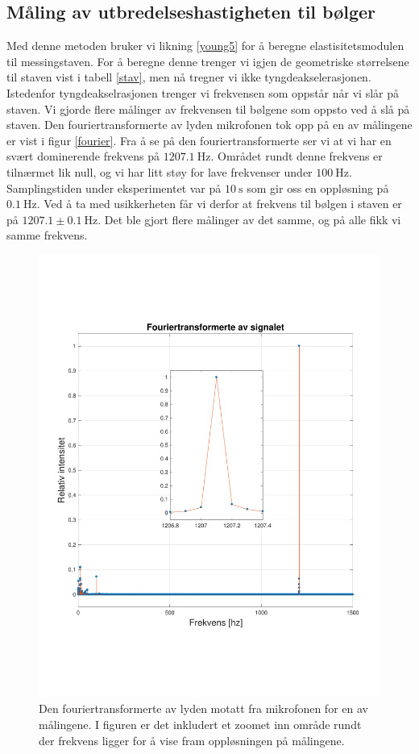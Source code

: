 \documentclass[%
 reprint,
 amsmath,amssymb,
 aps,
]{revtex4-1}
\begin{document}
\subsection{Måling av utbredelseshastigheten til bølger}
Med denne metoden bruker vi likning \eqref{young5} for å beregne elastisitetsmodulen til messingstaven. For å beregne denne trenger vi igjen de geometriske størrelsene til staven vist i tabell \vref{stav}, men nå tregner vi ikke tyngdeakselerasjonen. Istedenfor tyngdeakselrasjonen trenger vi frekvensen som oppstår når vi slår på staven.
Vi gjorde flere målinger av frekvensen til bølgene som oppsto ved å slå på staven. Den fouriertransformerte av lyden mikrofonen tok opp på en av målingene er vist i figur \vref{fourier}. Fra å se på den fouriertransformerte ser vi at vi har en svært dominerende frekvens på $\SI{1207.1}{\hertz}$. Området rundt denne frekvens er tilnærmet lik null, og vi har litt støy for lave frekvenser under $\SI{100}{\hertz}$. Samplingstiden under eksperimentet var på $\SI{10}{\second}$ som gir oss en oppløsning på $\SI{0.1}{\hertz}$. Ved å ta med usikkerheten får vi derfor at frekvens til bølgen i staven er på $1207.1\pm\SI{0.1}{\hertz}$. Det ble gjort flere målinger av det samme, og på alle fikk vi samme frekvens.
\begin{figure}[h!]
  \centering
  \includegraphics[scale=0.4]{fourier.pdf}
  \caption{Den fouriertransformerte av lyden motatt fra mikrofonen for en av målingene. I figuren er det inkludert et zoomet inn område rundt der frekvens ligger for å vise fram oppløsningen på målingene.}
  \label{fourier}
\end{figure}
\end{document}
